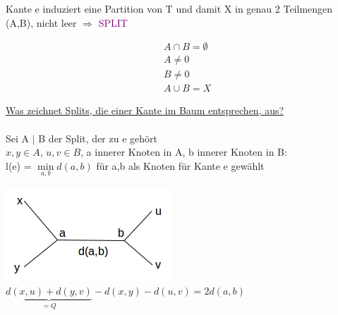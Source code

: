Kante e induziert eine Partition von T und damit X in genau 2 Teilmengen (A,B), nicht leer $\Rightarrow$ \textcolor{purple}{SPLIT}

\begin{align*}
 	&A \cap B = \emptyset \\
 	&A \neq 0 \\
 	&B \neq 0 \\
 	&A \cup B = X
\end{align*}

\underline{Was zeichnet Splits, die einer Kante im Baum entsprechen, aus?}\\\\
Sei A $|$ B der Split, der zu e gehört\\
$x,y \in A$, $u,v \in B$, a innerer Knoten in A, b innerer Knoten in B:\\
l(e) = $\min \limits_{a,b} d(a,b)$ für a,b als Knoten für Kante e gewählt


\begin{center}
	\includegraphics[scale=1]{lectures/161209/pix/pic6.jpg}\\
	$\underbrace{d(x,u) + d(y,v)}_{=Q} - d(x,y) - d(u,v) = 2d(a,b)$
\end{center}

\newpage

